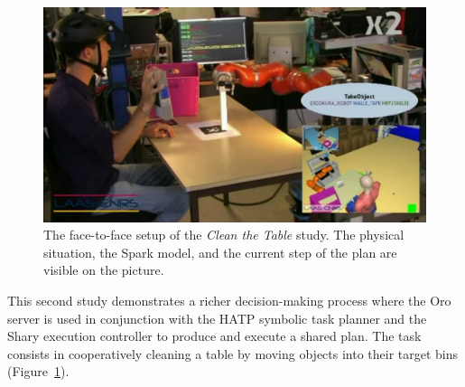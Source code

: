 \documentclass[preprint,3p,times]{elsarticle}
\begin{document}
\begin{figure}[ht!]
    \centering
    \includegraphics[width=0.6\columnwidth]{cleantable.jpg}

    \caption{The face-to-face setup of the \emph{Clean the Table} study. The
    physical situation, the {\sc Spark} model, and the current step of the plan
    are visible on the picture.}

    \label{fig|cleantable-video}
\end{figure}

This second study demonstrates a richer decision-making process where the {\sc
Oro} server is used in conjunction with the HATP symbolic task planner and the
{\sc Shary} execution controller to produce and execute a shared plan. The task
consists in cooperatively cleaning a table by moving objects into their target
bins (Figure~\ref{fig|cleantable-video}).

\end{document}
